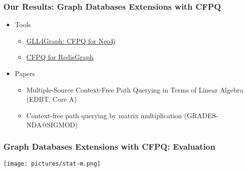 \documentclass[xcolor=table,aspectratio=169]{beamer}
\begin{document}
\begin{frame}[fragile]
  \frametitle{Our Results: Graph Databases Extensions with CFPQ}
    \begin{itemize}
      \item Tools
      \begin{itemize}                
        \item \href{https://github.com/JetBrains-Research/GLL4Graph}{GLL4Graph: CFPQ for Neo4j}
        \item \href{https://github.com/YaccConstructor/RedisGraph}{CFPQ for RedisGraph}
      \end{itemize}
      \pause
      \item Papers
      \begin{itemize}                
        \item Multiple-Source Context-Free Path Querying in Terms of Linear Algebra (EDBT, Core A)
        \item Context-free path querying by matrix multiplication (GRADES-NDA@SIGMOD)
      \end{itemize} 
    \end{itemize}
\end{frame}

\begin{frame}[fragile]
  \frametitle{Graph Databases Extensions with CFPQ: Evaluation}

  \begin{center}      
    \texttt{[image: pictures/stat-m.png]}
\end{center} 

\end{frame}
\end{document}
